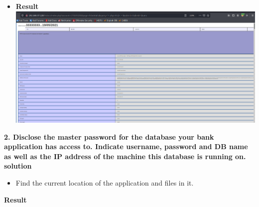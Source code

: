 \begin{Shaded}
\begin{Highlighting}[]
 \OperatorTok{=}\StringTok{\textquotesingle{}\textquotesingle{}}\NormalTok{()}\StringTok{\textquotesingle{}\textquotesingle{}}\OtherTok{;}  
\end{Highlighting}
\end{Shaded}

\begin{itemize}
\tightlist
\item
  \textbf{Result} \includegraphics{images/task2/phpinfo.PNG}
\end{itemize}

\textbf{2. Disclose the master password for the database your bank
application has access to. Indicate username, password and DB name as
well as the IP address of the machine this database is running on.}
\textbf{solution}

\begin{itemize}
\tightlist
\item
  Find the current location of the application and files in it.
\end{itemize}

\begin{Shaded}
\begin{Highlighting}[]
\end{Highlighting}
\end{Shaded}

\begin{Shaded}
\begin{Highlighting}[]
\end{Highlighting}
\end{Shaded}

\textbf{Result}

